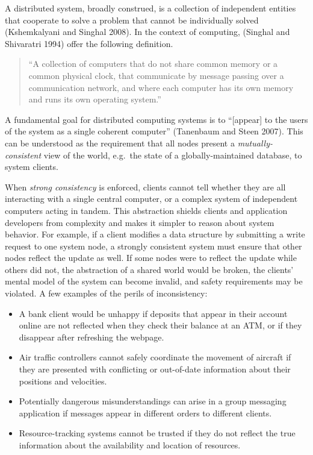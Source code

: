 \documentclass[]             %
{NASA}                       %
\theoremstyle{definition}
\begin{document}
\label{sec:background}

A distributed system, broadly construed, is a collection of independent
entities that cooperate to solve a problem that cannot be individually
solved (Kshemkalyani and Singhal 2008). In the context of computing,
(Singhal and Shivaratri 1994) offer the following definition.

\begin{quote}
``A collection of computers that do not share common memory or a common
physical clock, that communicate by message passing over a communication
network, and where each computer has its own memory and runs its own
operating system.''
\end{quote}

A fundamental goal for distributed computing systems is to
``{[}appear{]} to the users of the system as a single coherent
computer'' (Tanenbaum and Steen 2007). This can be understood as the
requirement that all nodes present a \emph{mutually-consistent} view of
the world, e.g.~the state of a globally-maintained database, to system
clients.

When \emph{strong consistency} is enforced, clients cannot tell whether
they are all interacting with a single central computer, or a complex
system of independent computers acting in tandem. This abstraction
shields clients and application developers from complexity and makes it
simpler to reason about system behavior. For example, if a client
modifies a data structure by submitting a write request to one system
node, a strongly consistent system must ensure that other nodes reflect
the update as well. If some nodes were to reflect the update while
others did not, the abstraction of a shared world would be broken, the
clients' mental model of the system can become invalid, and safety
requirements may be violated. A few examples of the perils of
inconsistency:

\begin{itemize}
\item
  A bank client would be unhappy if deposits that appear in their
  account online are not reflected when they check their balance at an
  ATM, or if they disappear after refreshing the webpage.
\item
  Air traffic controllers cannot safely coordinate the movement of
  aircraft if they are presented with conflicting or out-of-date
  information about their positions and velocities.
\item
  Potentially dangerous misunderstandings can arise in a group messaging
  application if messages appear in different orders to different
  clients.
\item
  Resource-tracking systems cannot be trusted if they do not reflect the
  true information about the availability and location of resources.
\end{itemize}
\end{document}
